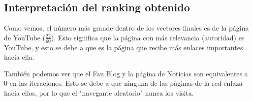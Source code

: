 \documentclass[12pt,letterpaper]{article}
\begin{document}
\subsection{Interpretación del ranking obtenido}
Como vemos, el número más grande dentro de los vectores finales es de la página de YouTube ($\frac{22}{60}$). Esto significa que la página con más relevancia (autoridad) es YouTube, y esto se debe a que es la página que recibe más enlaces importantes hacia ella.

También podemos ver que el Fan Blog y la página de Noticias son equivalentes a 0 en las iteraciones. Esto se debe a que ninguna de las páginas de la red enlaza hacia ellos, por lo que el "navegante aleatorio" nunca los visita.
\end{document}
